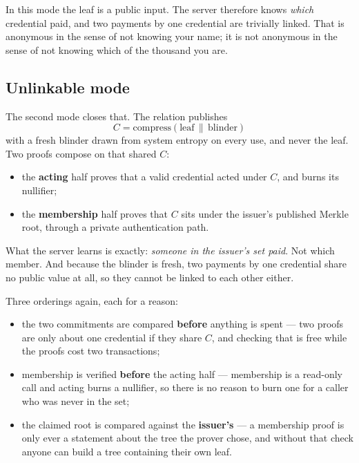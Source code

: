 \documentclass[11pt,a4paper]{article}
\begin{document}
In this mode the leaf is a public input. The server therefore knows
\emph{which} credential paid, and two payments by one credential are trivially
linked. That is anonymous in the sense of not knowing your name; it is not
anonymous in the sense of not knowing which of the thousand you are.

\subsection{Unlinkable mode}

The second mode closes that. The relation publishes
\[
  C = \mathrm{compress}(\mathrm{leaf} \,\|\, \mathrm{blinder})
\]
with a fresh blinder drawn from system entropy on every use, and never the
leaf. Two proofs compose on that shared $C$:

\begin{itemize}
  \item the \textbf{acting} half proves that a valid credential acted under $C$,
    and burns its nullifier;
  \item the \textbf{membership} half proves that $C$ sits under the issuer's
    published Merkle root, through a private authentication path.
\end{itemize}

What the server learns is exactly: \emph{someone in the issuer's set paid}. Not
which member. And because the blinder is fresh, two payments by one credential
share no public value at all, so they cannot be linked to each other either.

Three orderings again, each for a reason:

\begin{itemize}
  \item the two commitments are compared \textbf{before} anything is spent ---
    two proofs are only about one credential if they share $C$, and checking
    that is free while the proofs cost two transactions;
  \item membership is verified \textbf{before} the acting half --- membership is
    a read-only call and acting burns a nullifier, so there is no reason to
    burn one for a caller who was never in the set;
  \item the claimed root is compared against the \textbf{issuer's} --- a
    membership proof is only ever a statement about the tree the prover chose,
    and without that check anyone can build a tree containing their own leaf.
\end{itemize}
\end{document}

